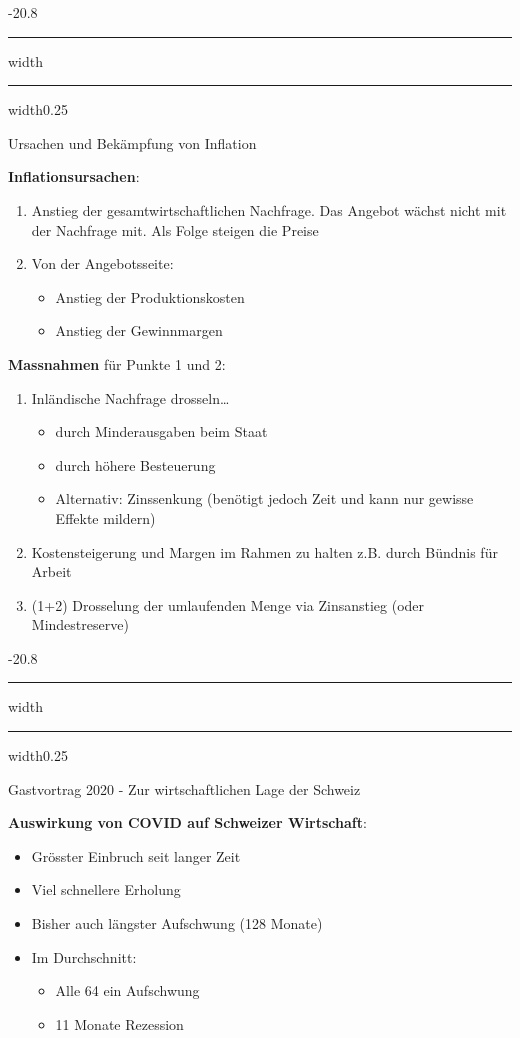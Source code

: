 \documentclass[9pt, landscape, fleqn]{scrartcl}
\makeatletter
\renewcommand{\section}{\@startsection{section}{1}{0mm}%
{-2\baselineskip}{0.8\baselineskip}%
{\hrule depth 0.2pt width\columnwidth\hrule depth1.5pt
width0.25\columnwidth\vspace*{1.2em}\Large\bfseries\rmfamily}}
\renewcommand{\subsection}{\@startsection{subsection}{1}{0mm}%
{-2\baselineskip}{0.8\baselineskip}%
{\hrule depth 0.2pt width\columnwidth\hrule depth0.75pt
width0.25\columnwidth\vspace*{1.2em}\large\bfseries\rmfamily}}
\makeatother
\begin{document}
\begin{multicols*}{3}
\subsection{Ursachen und Bekämpfung von Inflation}

\textbf{Inflationsursachen}:

\begin{enumerate}
    \item Anstieg der gesamtwirtschaftlichen Nachfrage. Das Angebot wächst nicht mit der Nachfrage mit. Als Folge steigen die Preise 
    \item Von der Angebotsseite: 
    \begin{itemize}
        \item Anstieg der Produktionskosten 
        \item Anstieg der Gewinnmargen 
    \end{itemize}
\end{enumerate}

\textbf{Massnahmen} für Punkte 1 und 2:

\begin{enumerate}
    \item Inländische Nachfrage drosseln\dots
    \begin{itemize}
        \item durch Minderausgaben beim Staat
        \item durch höhere Besteuerung 
        \item Alternativ: Zinssenkung (benötigt jedoch Zeit und kann nur gewisse Effekte mildern)
    \end{itemize}
    \item Kostensteigerung und Margen im Rahmen zu halten z.B. durch Bündnis für Arbeit 
    \item (1+2) Drosselung der umlaufenden Menge via Zinsanstieg (oder Mindestreserve)
\end{enumerate}

\section{Gastvortrag 2020 - Zur wirtschaftlichen Lage der Schweiz}

\textbf{Auswirkung von COVID auf Schweizer Wirtschaft}:

\begin{itemize}
    \item Grösster Einbruch seit langer Zeit 
    \item Viel schnellere Erholung 
    \item Bisher auch längster Aufschwung (128 Monate)
    \item Im Durchschnitt:
    \begin{itemize}
        \item Alle 64 ein Aufschwung
        \item 11 Monate Rezession
    \end{itemize}
\end{itemize}


\end{multicols*}
\end{document}
